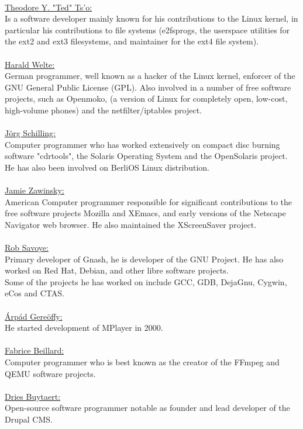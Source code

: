 \documentclass[10pt, a4paper, oneside]{report}
\begin{document}
\\
\underline{Theodore Y. "Ted" Ts'o:}\\
Is a software developer mainly known for his contributions to the Linux kernel, in particular his contributions to file systems (e2fsprogs, the userspace utilities for the ext2 and ext3 filesystems, and maintainer for the ext4 file system).\\
\\
\underline{Harald Welte:}\\
German programmer, well known as a hacker of the Linux kernel, enforcer of the GNU General Public License (GPL).  Also involved in a number of free software projects, such as Openmoko, (a version of Linux for completely open, low-cost, high-volume phones) and the netfilter/iptables project.\\
\\
\underline{Jörg Schilling:}\\
Computer programmer who has worked extensively on compact disc burning software "cdrtools", the Solaris Operating System and the OpenSolaris project. He has also been involved on BerliOS Linux distribution.\\
\\
\underline{Jamie Zawinsky:}\\
American Computer programmer responsible for significant contributions to the free software projects Mozilla and XEmacs, and early versions of the Netscape Navigator web browser. He also maintained the XScreenSaver project.\\
\\
\underline{Rob Savoye:}\\
Primary developer of Gnash, he is developer of the GNU Project. He has also worked on Red Hat, Debian, and other libre software projects.\\
Some of the projects he has worked on include GCC, GDB, DejaGnu, Cygwin, eCos and CTAS.\\
\\
\underline{Árpád Gereöffy:}\\ 
He started development of MPlayer in 2000.\\
\\
\underline{Fabrice Beillard:}\\
Computer programmer who is best known as the creator of the FFmpeg and QEMU software projects.\\
\\
\underline{Dries Buytaert:}\\
Open-source software programmer notable as founder and lead developer of the Drupal CMS.\\
\end{document}
